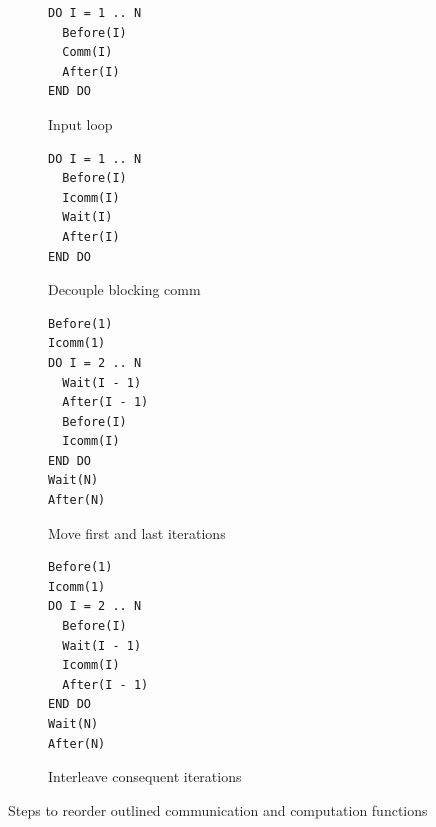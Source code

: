 \begin{figure}
{\scriptsize
  \centering
  \begin{subfigure}[b]{.25\textwidth}
\begin{verbatim}
DO I = 1 .. N
  Before(I)
  Comm(I)
  After(I)
END DO
\end{verbatim}
    \caption{Input loop}
    \label{fig:cco:reorder:a}
    \vspace{.1in}
  \end{subfigure}
  \begin{subfigure}[b]{.25\textwidth}
\begin{verbatim}
DO I = 1 .. N
  Before(I)
  Icomm(I)
  Wait(I)
  After(I)
END DO
\end{verbatim}
    \caption{Decouple blocking comm}
    \label{fig:cco:reorder:b}
    \vspace{.1in}
  \end{subfigure}
  \begin{subfigure}[b]{.25\textwidth}
\begin{verbatim}
Before(1)
Icomm(1)
DO I = 2 .. N
  Wait(I - 1)
  After(I - 1)
  Before(I)
  Icomm(I)
END DO
Wait(N)
After(N)
\end{verbatim}
    \caption{Move first and last iterations}
    \label{fig:cco:reorder:c}
  \end{subfigure}
  \begin{subfigure}[b]{.25\textwidth}
\begin{verbatim}
Before(1)
Icomm(1)
DO I = 2 .. N
  Before(I)
  Wait(I - 1)
  Icomm(I)
  After(I - 1)
END DO
Wait(N)
After(N)
\end{verbatim}
    \caption{Interleave consequent iterations}
    \label{fig:cco:reorder:d}
  \end{subfigure}
\caption{Steps to reorder outlined communication and computation functions}
\label{fig:cco:reorder}
}
\end{figure}

